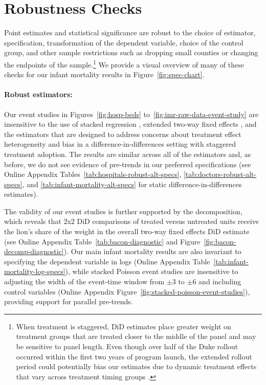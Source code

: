 \documentclass[12pt]{article}
\begin{document}
\section{Robustness Checks} \label{sec:robustness}

Point estimates and statistical significance are robust to the choice of estimator, specification, transformation of the dependent variable, choice of the control group, and other sample restrictions such as dropping small counties or changing the endpoints of the sample.\footnote{When treatment is staggered, DiD estimates place greater weight on treatment groups that are treated closer to the middle of the panel and may be sensitive to panel length.
Even though over half of the Duke rollout occurred within the first two years of program launch, the extended rollout period could potentially bias our estimates due to dynamic treatment effects that vary across treatment timing groups .}  
We provide a visual overview of many of these checks for our infant mortality results in Figure~\ref{fig:spec-chart}. 

\paragraph{Robust estimators:} 
Our event studies in Figures~\ref{fig:hosp-beds} to~\ref{fig:imr-raw-data-event-study} are insensitive to the use of stacked regression , extended two-way fixed effects , and the  estimators that are designed to address concerns about treatment effect heterogeneity and bias in a difference-in-differences setting with staggered treatment adoption. 
The results are similar across all of the estimators and, as before, we do not see evidence of pre-trends in our preferred specifications (see Online Appendix Tables~\ref{tab:hospitals-robust-alt-specs}, \ref{tab:doctors-robust-alt-specs}, and \ref{tab:infant-mortality-alt-specs} for static difference-in-differences estimates). 

The validity of our event studies is further supported by the  decomposition, which reveals that 2x2 DiD comparisons of treated versus untreated units receive the lion's share of the weight in the overall two-way fixed effects DiD estimate (see Online Appendix Table~\ref{tab:bacon-diagnostic} and Figure~\ref{fig:bacon-decomp-diagnostic}). 
Our main infant mortality results are also invariant to specifying the dependent variable in logs (Online Appendix Table~\ref{tab:infant-mortality-log-specs}), while stacked Poisson event studies are insensitive to adjusting the width of the event-time window from $\pm3$ to $\pm6$ and including control variables (Online Appendix Figure~\ref{fig:stacked-poisson-event-studies}), providing support for parallel pre-trends. 
\end{document}
